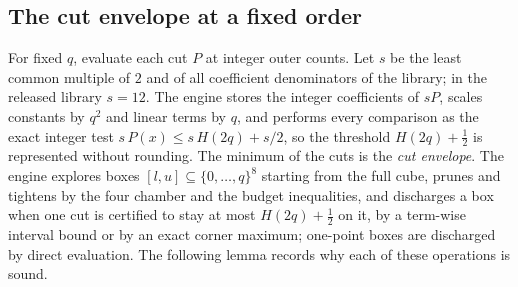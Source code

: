 \documentclass[11pt]{amsart}
\theoremstyle{definition}
\theoremstyle{remark}
\begin{document}
\subsection{The cut envelope at a fixed order}

For fixed $q$, evaluate each cut $P$ at integer outer counts.  Let $s$ be
the least common multiple of $2$ and of all coefficient denominators of the
library; in the released library $s=12$.  The engine stores the integer
coefficients of $sP$, scales constants by $q^2$ and linear terms by $q$, and
performs every comparison as the exact integer test
$s\,P(x)\le s\,H(2q)+s/2$, so the threshold $H(2q)+\frac12$ is represented
without rounding.  The minimum of the cuts is the \emph{cut envelope}.  The
engine explores boxes $[l,u]\subseteq\{0,\ldots,q\}^8$ starting from the full
cube, prunes and tightens by the four chamber and the budget inequalities,
and discharges a box when one cut is certified to stay at most
$H(2q)+\frac12$ on it, by a term-wise interval bound or by an exact corner
maximum; one-point boxes are discharged by direct evaluation.  The following
lemma records why each of these operations is sound.
\end{document}
